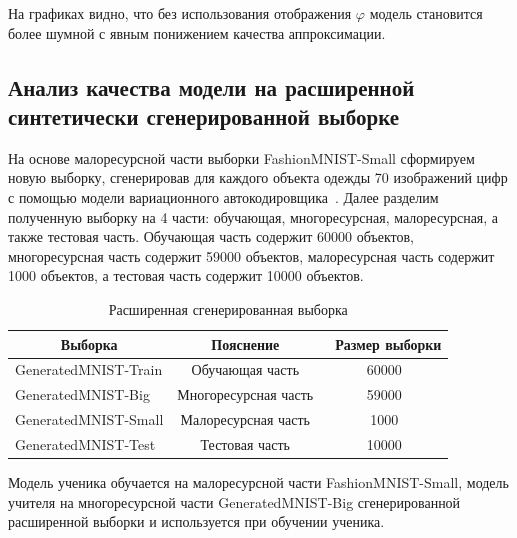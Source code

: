 На графиках видно, что без использования отображения $\varphi$ модель становится более шумной с явным понижением качества аппроксимации.

\newpage
\subsection{Анализ качества модели на расширенной синтетически сгенерированной выборке}
На основе малоресурсной части выборки FashionMNIST-Small сформируем новую выборку, сгенерировав для каждого объекта одежды 70 изображений цифр с помощью модели вариационного автокодировщика~\cite{VAE}. Далее разделим полученную выборку на 4 части: обучающая, многоресурсная, малоресурсная, а также тестовая часть. Обучающая часть содержит 60000 объектов, многоресурсная часть содержит 59000 объектов, малоресурсная часть содержит 1000 объектов, а тестовая часть содержит 10000 объектов.
\begin{table}[h!t]
\begin{center}
\caption{Расширенная сгенерированная выборка}
\label{table_1}
\begin{tabular}{|c|c|c|}
\hline
	Выборка & Пояснение &\ Размер выборки\\
	\hline
	\multicolumn{1}{|l|}{GeneratedMNIST-Train}
	& Обучающая часть& 60000\\
	\hline
	\multicolumn{1}{|l|}{GeneratedMNIST-Big}
	& Многоресурсная часть& 59000\\
	\hline
	\multicolumn{1}{|l|}{GeneratedMNIST-Small}
	& Малоресурсная часть& 1000\\
	\hline
	\multicolumn{1}{|l|}{GeneratedMNIST-Test}
	& Тестовая часть& 10000\\

\hline

\end{tabular}
\end{center}
\end{table}

Модель ученика обучается на малоресурсной части FashionMNIST-Small, модель учителя на многоресурсной части GeneratedMNIST-Big сгенерированной расширенной выборки и используется при обучении ученика.

